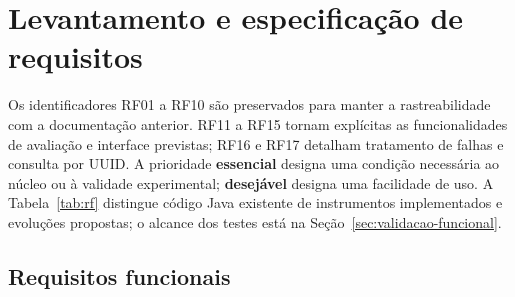 \section{Levantamento e especificação de requisitos}
\label{sec:requisitos}
Os identificadores RF01 a RF10 são preservados para manter a rastreabilidade com a documentação anterior. RF11 a RF15 tornam explícitas as funcionalidades de avaliação e interface previstas; RF16 e RF17 detalham tratamento de falhas e consulta por UUID. A prioridade \textbf{essencial} designa uma condição necessária ao núcleo ou à validade experimental; \textbf{desejável} designa uma facilidade de uso. A Tabela~\ref{tab:rf} distingue código Java existente de instrumentos implementados e evoluções propostas; o alcance dos testes está na Seção~\ref{sec:validacao-funcional}.

\subsection{Requisitos funcionais}
